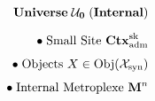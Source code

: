 \documentclass[preview]{standalone}
\begin{document}
\begin{align*}
\special{dvisvgm:raw <g id='unique000'>}\mathbf{Universe\;\mathcal{U}_0\;(Internal)}\\[6pt]\bullet\;\text{Small Site }\mathbf{Ctx}_{\text{adm}}^{\text{sk}}\\[4pt]\bullet\;\text{Objects }X\in\operatorname{Obj}(\mathcal{X}_{\text{syn}})\\[4pt]\bullet\;\text{Internal Metroplexe }\mathbf{M}^n\special{dvisvgm:raw </g>}
\end{align*}
\end{document}
